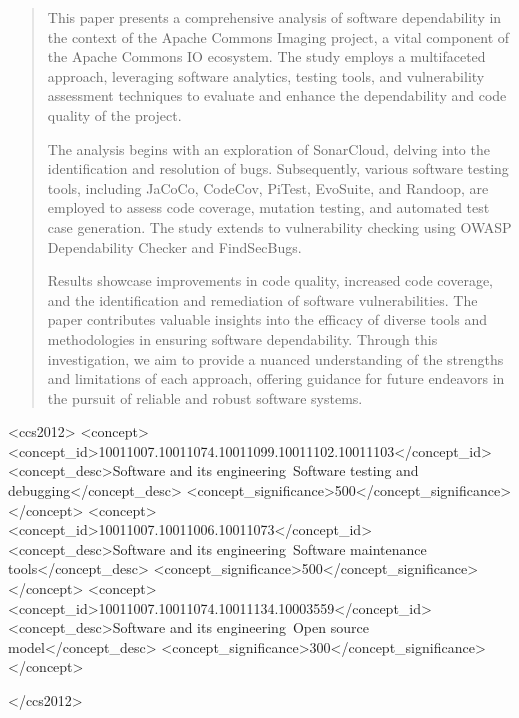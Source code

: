 \documentclass[sigconf]{acmart}
\begin{document}
\begin{abstract}
  This paper presents a comprehensive analysis of software dependability in the context of the Apache Commons Imaging project, a vital component of the Apache Commons IO ecosystem. The study employs a multifaceted approach, leveraging software analytics, testing tools, and vulnerability assessment techniques to evaluate and enhance the dependability and code quality of the project.

  The analysis begins with an exploration of SonarCloud, delving into the identification and resolution of bugs. Subsequently, various software testing tools, including JaCoCo, CodeCov, PiTest, EvoSuite, and Randoop, are employed to assess code coverage, mutation testing, and automated test case generation. The study extends to vulnerability checking using OWASP Dependability Checker and FindSecBugs.
  
  Results showcase improvements in code quality, increased code coverage, and the identification and remediation of software vulnerabilities. The paper contributes valuable insights into the efficacy of diverse tools and methodologies in ensuring software dependability. Through this investigation, we aim to provide a nuanced understanding of the strengths and limitations of each approach, offering guidance for future endeavors in the pursuit of reliable and robust software systems.
\end{abstract}

\begin{CCSXML}
<ccs2012>
   <concept>
       <concept_id>10011007.10011074.10011099.10011102.10011103</concept_id>
       <concept_desc>Software and its engineering~Software testing and debugging</concept_desc>
       <concept_significance>500</concept_significance>
    </concept>
    <concept>
       <concept_id>10011007.10011006.10011073</concept_id>
       <concept_desc>Software and its engineering~Software maintenance tools</concept_desc>
       <concept_significance>500</concept_significance>
   </concept>
   <concept>
       <concept_id>10011007.10011074.10011134.10003559</concept_id>
       <concept_desc>Software and its engineering~Open source model</concept_desc>
       <concept_significance>300</concept_significance>
   </concept>

 </ccs2012>
\end{CCSXML}
\end{document}
